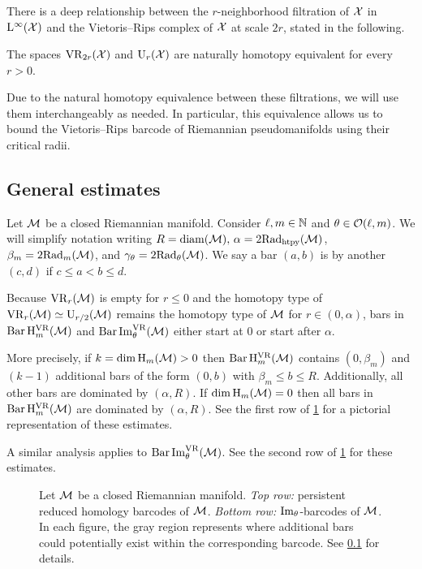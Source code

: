 \subsubsection{}\label{ss:kuratowski_vr}

There is a deep relationship between the \(r\)-neighborhood filtration of $\mathcal{X}$ in $\mathrm{L}^\infty(\mathcal{X})$ and the Vietoris--Rips complex of \(\mathcal{X}\) at scale \(2r\), stated in the following.

\proposition \cite[Theorem~4.1]{lim2024vietoris} The spaces $\mathrm{VR}_{2r}(\mathcal{X})$ and $\mathrm{U}_r(\mathcal{X})$ are naturally homotopy equivalent for every \(r > 0\).

\medskip Due to the natural homotopy equivalence between these filtrations, we will use them interchangeably as needed.
In particular, this equivalence allows us to bound the Vietoris--Rips barcode of Riemannian pseudomanifolds using their critical radii.

\subsection{General estimates}\label{ss:barcode_general}

Let \(\mathcal{M}\) be a closed Riemannian manifold.
Consider \(\ell, m \in \mathbb{N}\) and \(\theta \in \mathcal{O}(\ell,m)\).
We will simplify notation writing \(R = \operatorname{diam}(\mathcal{M}),\, \alpha = 2\mathrm{Rad}_{\mathrm{htpy}}(\mathcal{M})\), \(\beta_m = 2\mathrm{Rad}_{m}(\mathcal{M})\), and \(\gamma_\theta = 2\mathrm{Rad}_{\theta}(\mathcal{M})\).
We say a bar $(a, b)$ is  by another $(c,d)$ if $c \leq a < b \leq d$.

Because $\mathrm{VR}_r(\mathcal{M})$ is empty for \(r \leq 0\) and the homotopy type of $\mathrm{VR}_r(\mathcal{M})\simeq \mathrm{U}_{r/2}(\mathcal{M})$ remains the homotopy type of $\mathcal{M}$ for $r \in (0, \alpha)$, bars in \(\operatorname{Bar} \mathrm{H}_m^{\mathrm{VR}}(\mathcal{M})\) and $\operatorname{Bar}\operatorname{Im}_\theta^{\mathrm{VR}}(\mathcal{M})$ either start at $0$ or start after $\alpha$.

More precisely, if \(k = \dim \operatorname{H}_m(\mathcal{M}) > 0\) then $\operatorname{Bar}\mathrm{H}_m^{\mathrm{VR}}(\mathcal{M})$ contains $(0, \beta_m)$ and \((k - 1)\) additional bars of the form \((0, b)\) with \(\beta_m \leq b \leq R\).
Additionally, all other bars are dominated by \((\alpha, R)\).
If \(\dim \operatorname{H}_m(\mathcal{M}) = 0\) then all bars in \(\operatorname{Bar}\mathrm{H}_m^{\mathrm{VR}}(\mathcal{M})\) are dominated by \((\alpha, R)\).
See the first row of \cref{fig:barcodes_general} for a pictorial representation of these estimates.

A similar analysis applies to $\operatorname{Bar}\operatorname{Im}_\theta^{\mathrm{VR}}(\mathcal{M})$.
See the second row of \cref{fig:barcodes_general} for these estimates.

\begin{figure}
	\centering
	
	\caption{Let $\mathcal{M}$ be a closed Riemannian manifold.
		\emph{Top row:} persistent reduced homology barcodes of $\mathcal{M}$.
		\emph{Bottom row:} $\operatorname{Im}_\theta$-barcodes of $\mathcal{M}$.
		In each figure, the gray region represents where additional bars could potentially exist within the corresponding barcode.
		See \cref{ss:barcode_general} for details.}
	\label{fig:barcodes_general}
\end{figure}
